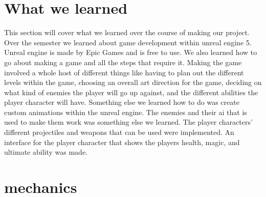 \documentclass{sigchi}
\begin{document}
\section{What we learned}
This section will cover what we learned over the course of  making our project. Over the semester we learned about game development within unreal engine 5. Unreal engine is made by Epic Games and is free to use. We also learned how to go about making a game and all the steps that require it. Making the game involved a whole host of different things like having to plan out the different levels within the game, choosing an overall art direction for the game, deciding on what kind of enemies the player will go up against, and the different abilities the player character will have. Something else we learned how to do was create custom animations within the unreal engine. The enemies and their ai that is used to make them work was something else we learned. The player characters' different projectiles and weapons that can be used were implemented. An interface for the player character that shows the players health, magic, and ultimate ability was made. 

\section{mechanics}
\end{document}
